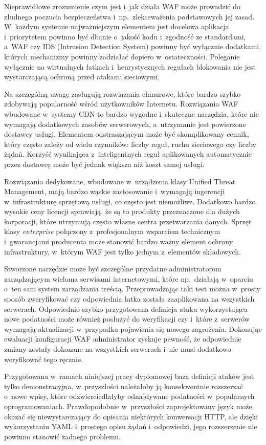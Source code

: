 \documentclass[12pt,a4paper,polish,thesis]{dcsbook}
\begin{document}
Nieprawidłowe zrozumienie czym jest i~jak działa WAF może prowadzić do złudnego poczucia bezpieczeństwa i~np.~zlekceważenia podstawowych jej zasad. W~każdym systemie najważniejszym elementem jest docelowa aplikacja i~priorytetem powinno być dbanie o~jakość kodu i~zgodność ze standardami, a~WAF czy IDS (Intrusion Detection System) powinny być wyłącznie dodatkami, których mechanizmy powinny zadziałać dopiero w~ostateczności. Poleganie wyłącznie na wirtualnych łatkach i~heurystycznych regułach blokowania nie jest wystarczającą ochroną przed atakami sieciowymi.

Na szczególną uwagę zasługują rozwiązania chmurowe, które bardzo szybko zdobywają popularność wśród użytkowników Internetu. Rozwiązania WAF wbudowane w~systemy CDN to bardzo wygodne i~skuteczne narzędzia, które nie wymagają dodatkowych zasobów serwerowych, a~utrzymanie jest powierzone dostawcy usługi. Elementem odstraszającym może być skomplikowany cennik, który często zależy od wielu czynników: liczby reguł, ruchu sieciowego czy liczby żądań. Korzyść wynikająca z~inteligentnych reguł aplikowanych automatycznie przez dostawcę może być jednak większa niż koszt samej usługi.

Rozwiązania dedykowane, wbudowane w~urządzenia klasy Unified Threat Management, mają bardzo wąskie zastosowanie i~wymagają ingerencji w~infrastrukturę sprzętową usługi, co często jest niemożliwe. Dodatkowo bardzo wysokie ceny licencji sprawiają, że są to produkty przeznaczone dla dużych korporacji, które utrzymują często własne centra przetwarzania danych. Sprzęt klasy \textit{enterprise} połączony z~profesjonalnym wsparciem technicznym i~gwarancjami producenta może stanowić bardzo ważny element ochrony infrastruktury, w~którym WAF jest tylko jednym z~elementów składowych.

Stworzone narzędzie może być szczególne przydatne administratorom zarządzającym wieloma serwisami internetowymi, które np.~działają w~oparciu o~ten sam system zarządzania treścią. Przeprowadzając taki test można w~prosty sposób zweryfikować czy odpowiednia łatka została zaaplikowana na wszystkich serwerach. Odpowiednio szybko przygotowana definicja ataku wykorzystująca nowe podatności może również posłużyć do weryfikacji czy i~które z~serwerów wymagają aktualizacji w~przypadku pojawienia się nowego zagrożenia. Dokonując ewaluacji konfiguracji WAF administrator zyskuje pewność, że odpowiednie zmiany zostały dokonane na wszystkich serwerach i~nie musi dodatkowo weryfikować tego ręcznie.
 
Przygotowana w~ramach niniejszej pracy dyplomowej baza definicji ataków jest tylko demonstracyjna, w~przyszłości należałoby ją konsekwentnie rozszerzać o~nowe wpisy, które odzwierciedlałyby odnajdywane podatności w~popularnych oprogramowaniach. Prawdopodobnie w~przyszłości zaprojektowany język może okazać się niewystarczający do opisania niektórych konwersacji HTTP, ale dzięki wykorzystaniu YAML i~prostego opisu żądań i~odpowiedzi, jego rozszerzenie nie powinno stanowić żadnego problemu.
\end{document}
